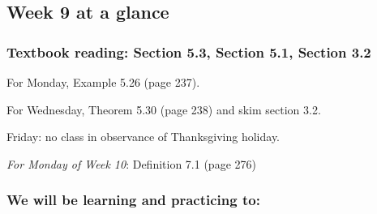 

\subsection*{Week 9 at a glance}

\vspace{-20pt}

\subsubsection*{Textbook reading: Section 5.3, Section 5.1, Section 3.2}

\vspace{-20pt}

For Monday, Example 5.26 (page 237).

For Wednesday,  Theorem 5.30 (page 238) and skim section 3.2.

Friday: no class in observance of Thanksgiving holiday.

{\it For Monday of Week 10}: Definition 7.1 (page 276)
\vspace{-20pt}

\subsubsection*{We will be learning and practicing to:}

\vspace{-20pt}

